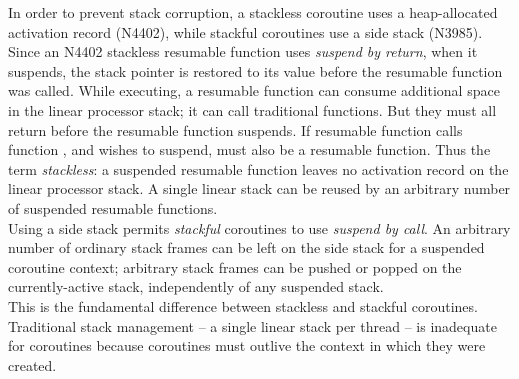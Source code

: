 In order to prevent stack corruption, a stackless coroutine uses a heap-allocated
activation record (N4402\cite{N4402}), while stackful coroutines use a side
stack (N3985\cite{N3985}).\\
Since an N4402 stackless resumable function uses \emph{suspend by return},
when it suspends, the stack pointer is restored to its value before the
resumable function was called. While executing, a resumable function can
consume additional space in the linear processor stack; it can call
traditional functions. But they must all return before the resumable function
suspends. If resumable function  calls function , and
 wishes to suspend,  must also be a resumable function. Thus
the term \emph{stackless}: a suspended resumable function leaves no activation
record on the linear processor stack. A single linear stack can be reused by
an arbitrary number of suspended resumable functions.\\
Using a side stack permits \emph{stackful} coroutines to use \emph{suspend by
call}. An arbitrary number of ordinary stack frames can be left on the side
stack for a suspended coroutine context; arbitrary stack frames can be pushed
or popped on the currently-active stack, independently of any suspended stack.\\
This is the fundamental difference between stackless and stackful coroutines.\\
\newline
Traditional stack management -- a single linear stack per thread -- is
inadequate for coroutines because coroutines must outlive the context in which
they were created.
\newpage
